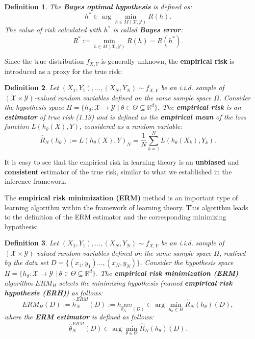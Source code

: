 \documentclass{report}
\newtheorem{definition}{Definition}[chapter]
\begin{document}
\begin{definition}
The \textbf{Bayes optimal hypothesis} is defined as:
\begin{equation}
h^*\in \arg \min_{h \in M(\mathcal{X}, \mathcal{Y})} R(h).
\end{equation}
The value of risk calculated with $h^*$ is called \textbf{Bayes error}:
\begin{equation}
R^* := \min_{h \in M(\mathcal{X}, \mathcal{Y})} R(h) = R(h^*).
\end{equation}
\end{definition}

Since the true distribution $f_{X,Y}$ is generally unknown, the \textbf{empirical risk} is introduced as a proxy for the true risk:

\begin{definition}
Let $(X_1, Y_1),\dots,(X_N, Y_N) \sim f_{X,Y}$ be an i.i.d. sample of $(\mathcal{X} \times \mathcal{Y})$-valued random variables defined on the same sample space $\Omega$. Consider the hypothesis space $H=\{h_\theta : \mathcal{X} \to \mathcal{Y} \mid\theta\in\Theta\subseteq\mathbb{R}^d\}$. The \textbf{empirical risk} is an \textbf{estimator} of true risk (1.19) and is defined as the \textbf{empirical mean} of the loss function $L(h_\theta(X), Y)$, considered as a random variable:
\begin{equation}
\hat{R}_N(h_\theta) := \overline{L(h_\theta(X),Y)}_N = \frac{1}{N}\sum_{k=1}^{N}L(h_\theta(X_k),Y_k).
\end{equation}
\end{definition}

It is easy to see that the empirical risk in learning theory is an \textbf{unbiased} and \textbf{consistent} estimator of the true risk, similar to what we established in the inference framework.

The \textbf{empirical risk minimization (ERM)} method is an important type of learning algorithm within the framework of learning theory. This algorithm leads to the definition of the ERM estimator and the corresponding minimizing hypothesis:

\begin{definition}
Let $(X_1, Y_1),\dots,(X_N, Y_N) \sim f_{X,Y}$ be an i.i.d. sample of $(\mathcal{X} \times \mathcal{Y})$-valued random variables defined on the same sample space $\Omega$, realized by the data set $D =\{(x_1, y_1)\dots,(x_N,y_N)\}$. Consider the hypothesis space $H = \{h_\theta : \mathcal{X} \to \mathcal{Y} \mid\theta\in\Theta\subseteq\mathbb{R}^d\}$. The \textbf{empirical risk minimization (ERM)} algorithm $ERM_H$ selects the minimizing hypothesis (named \textbf{empirical risk hypothesis (ERH)}) as follows:
\begin{equation}
ERM_H(D) := \hat{h}_N^{ERM}(D) := h_{\hat{\theta}^{ERM}_N(D)} \in \arg \min_{h_\theta \in H} \hat{R}_N(h_\theta)(D),
\end{equation}
where the \textbf{ERM estimator} is defined as follows:
\begin{equation}
\hat{\theta}^{ERM}_N(D) \in \arg\min_{\theta \in \Theta}\hat{R}_N(h_\theta)(D).
\end{equation}
\end{definition}
\end{document}
